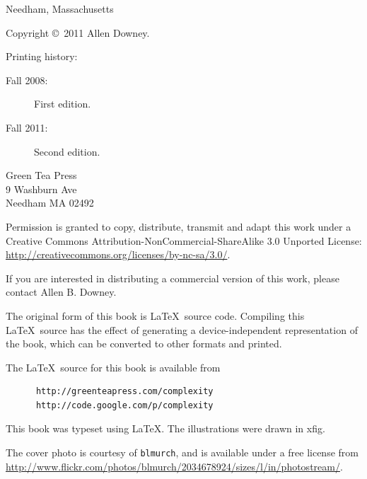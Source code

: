 \documentclass[10pt]{book}
\begin{document}
\begin{latexonly}
\begin{flushright}
{\small Needham, Massachusetts}

\vfill

\end{flushright}


\pagebreak
\thispagestyle{empty}

{\small
Copyright \copyright ~2011 Allen Downey.


Printing history:

\begin{description}

\item[Fall 2008:] First edition.

\item[Fall 2011:] Second edition.

\end{description}

\vspace{0.2in}

\begin{flushleft}
Green Tea Press       \\
9 Washburn Ave \\
Needham MA 02492
\end{flushleft}

Permission is granted to copy, distribute, transmit and adapt
this work under a Creative Commons 
Attribution-NonCommercial-ShareAlike 3.0 Unported License:
\url{http://creativecommons.org/licenses/by-nc-sa/3.0/}.

If you are interested in distributing a commercial version of this
work, please contact Allen B. Downey.

The original form of this book is \LaTeX\ source code.  Compiling this
\LaTeX\ source has the effect of generating a device-independent
representation of the book, which can be converted to other formats
and printed.

The \LaTeX\ source for this book is available from

\begin{verbatim}
      http://greenteapress.com/complexity
      http://code.google.com/p/complexity
\end{verbatim}

This book was typeset using \LaTeX .  The illustrations were
drawn in xfig.

The cover photo is courtesy of {\tt blmurch}, and is available
under a free license from
\url{http://www.flickr.com/photos/blmurch/2034678924/sizes/l/in/photostream/}.

\vspace{0.2in}

} %

\end{latexonly}
\end{document}
